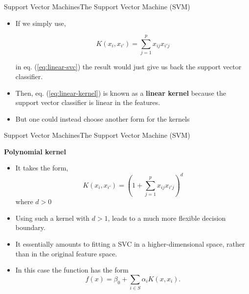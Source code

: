 \begin{frame}{Support Vector Machines}{The Support Vector Machine (SVM)}

\begin{itemize}
    
    \item If we simply use, \pause 

    \begin{equation}\label{eq:linear-kernel}
        K(x_i, x_{i'}) = \sum_{j=1}^p x_{ij}x_{i'j}
    \end{equation} \pause 
    
    in eq. (\ref{eq:linear-svc}) the result would just give us back the support vector classifier. \pause 

    \item Then, eq. (\ref{eq:linear-kernel}) is known as a \textbf{linear kernel} because the support vector classifier is linear in the features. 

    \item But one could instead choose another form for the kernels 

\end{itemize}
    
\end{frame}

\begin{frame}{Support Vector Machines}{The Support Vector Machine (SVM)}

\textbf{Polynomial kernel} \pause 

\begin{itemize}
    \item It takes the form, \pause 
    \begin{equation}
         K(x_i, x_{i'}) = ( 1 +  \sum_{j=1}^p x_{ij}x_{i'j} )^d
    \end{equation} \pause
    where $d > 0$ \pause 
    \item Using such a kernel with $d > 1$, leads to a much more flexible decision boundary.  \pause 
    \item It essentially amounts to fitting a SVC in a higher-dimensional space, rather than in the original feature space. \pause 
    \item In this case the function has the form  \pause 
    \begin{equation}
         f(x) = \beta_0 + \sum_{i \in S} \alpha_i K(x, x_{i}).
    \end{equation} \pause 

\end{itemize}


    
\end{frame}

